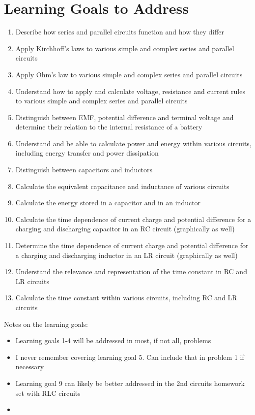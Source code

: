 \documentclass[11pt, fleqn]{article}
\begin{document}
\section*{Learning Goals to Address}
\begin{enumerate}
    \item Describe how series and parallel circuits function and how they differ 
    \item Apply Kirchhoff’s laws to various simple and complex series and parallel circuits
    \item Apply Ohm's law to various simple and complex series and parallel circuits
    \item Understand how to apply and calculate voltage, resistance and current rules to various simple and complex series and parallel circuits 
    \item Distinguish between EMF, potential difference and terminal voltage and determine their relation to the internal resistance of a battery 
    \item Understand and be able to calculate power and energy within various circuits, including energy transfer and power dissipation 
    \item Distinguish between capacitors and inductors 
    \item Calculate the equivalent capacitance and inductance of various circuits 
    \item Calculate the energy stored in a capacitor and in an inductor 
    \item Calculate the time dependence of current charge and potential difference for a charging and discharging capacitor in an RC circuit (graphically as well)
    \item Determine the time dependence of current charge and potential difference for a charging and discharging inductor in an LR circuit (graphically as well)
    \item Understand the relevance and representation of the time constant in RC and LR circuits
    \item Calculate the time constant within various circuits, including RC and LR circuits
\end{enumerate}
Notes on the learning goals:
\begin{itemize}
    \item Learning goals 1-4 will be addressed in most, if not all, problems
    \item I never remember covering learning goal 5. Can include that in problem 1 if necessary
    \item Learning goal 9 can likely be better addressed in the 2nd circuits homework set with RLC circuits
    \item 
\end{itemize}
\end{document}
